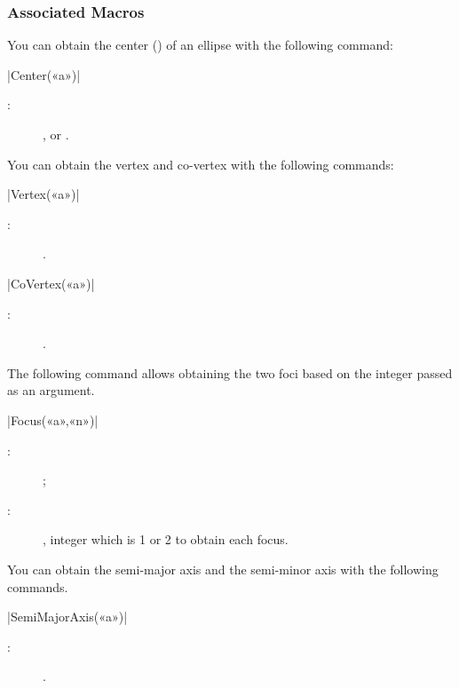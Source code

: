 \documentclass[a4paper,english]{article}
\begin{document}
\subsubsection{Associated Macros}

You can obtain the center () of an ellipse with the following command:
\begin{colourband}
  \macro|Center(«a»)|
  \begin{description}
    \item[:]  ,  or .
  \end{description}
\end{colourband}

You can obtain the vertex and co-vertex with the following commands:
\begin{colourband}
\macro|Vertex(«a»)|
\begin{description}
  \item[:]  .
\end{description}
\end{colourband}
\bigskip

\begin{colourband}
\macro|CoVertex(«a»)|
\begin{description}
  \item[:]  .
\end{description}
\end{colourband}
\bigskip

The following command allows obtaining the two foci based on the integer passed as an argument.
\begin{colourband}
\macro|Focus(«a»,«n»)|
\begin{description}
  \item[:]   ;
  \item[:] , integer which is 1 or 2 to obtain each focus.
\end{description}
\end{colourband}
\bigskip

You can obtain the semi-major axis and the semi-minor axis with the following commands.
\begin{colourband}
\macro|SemiMajorAxis(«a»)|
\begin{description}
  \item[:]  .
\end{description}
\end{colourband}
\bigskip
\end{document}
